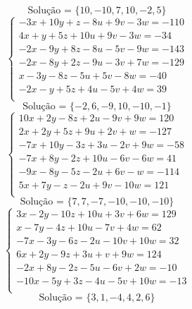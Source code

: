 \documentclass[12pt,oneside,a4paper]{article}
\begin{document}
\begin{equation*}
\text{Solução = }\{10,-10,7,10,-2,5\}
\end{equation*}
\vspace{\baselineskip}
\begin{equation*}
\begin{cases}
-3x+10y+z-8u+9v-3w=-110 \\
4x+y+5z+10u+9v-3w=-34 \\
-2x-9y+8z-8u-5v-9w=-143 \\
-2x-8y+2z-9u-3v+7w=-129 \\
x-3y-8z-5u+5v-8w=-40 \\
-2x-y+5z+4u-5v+4w=39 \\
\end{cases}
\end{equation*}
\begin{equation*}
\text{Solução = }\{-2,6,-9,10,-10,-1\}
\end{equation*}
\vspace{\baselineskip}
\begin{equation*}
\begin{cases}
10x+2y-8z+2u-9v+9w=120 \\
2x+2y+5z+9u+2v+w=-127 \\
-7x+10y-3z+3u-2v+9w=-58 \\
-7x+8y-2z+10u-6v-6w=41 \\
-9x-8y-5z-2u+6v-w=-114 \\
5x+7y-z-2u+9v-10w=121 \\
\end{cases}
\end{equation*}
\begin{equation*}
\text{Solução = }\{7,7,-7,-10,-10,-10\}
\end{equation*}
\vspace{\baselineskip}
\begin{equation*}
\begin{cases}
3x-2y-10z+10u+3v+6w=129 \\
x-7y-4z+10u-7v+4w=62 \\
-7x-3y-6z-2u-10v+10w=32 \\
6x+2y-9z+3u+v+9w=124 \\
-2x+8y-2z-5u-6v+2w=-10 \\
-10x-5y+3z-4u-5v+10w=-13 \\
\end{cases}
\end{equation*}
\begin{equation*}
\text{Solução = }\{3,1,-4,4,2,6\}
\end{equation*}
\end{document}
